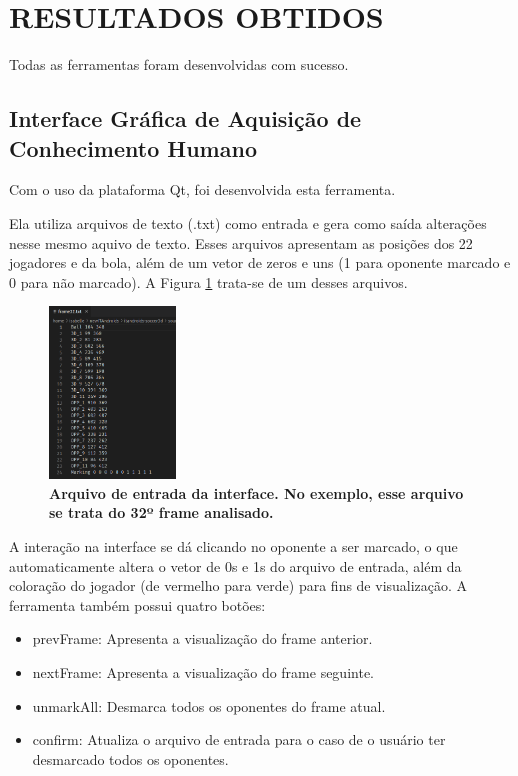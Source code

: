 \documentclass[10pt,fleqn,a4paper]{article}
\begin{document}
    \section{RESULTADOS OBTIDOS}
    
    Todas as ferramentas foram desenvolvidas com sucesso.
    
    \subsection{Interface Gráfica de Aquisição de Conhecimento Humano}
    
    Com o uso da plataforma Qt, foi desenvolvida esta ferramenta.
    
    Ela utiliza arquivos de texto (.txt) como entrada e gera como saída alterações nesse mesmo aquivo de texto. Esses arquivos apresentam as posições dos 22 jogadores e da bola, além de um vetor de zeros e uns (1 para oponente marcado e 0 para não marcado). A Figura \ref{fig:arquivo-de-entrada} trata-se de um desses arquivos.
    
\begin{figure}[H]
\centering
\includegraphics[width=0.3\textwidth]{figures/arquivo-de-entrada.png}
\caption{\textbf{Arquivo de entrada da interface. No exemplo, esse arquivo se trata do 32º frame analisado.}} \label{fig:arquivo-de-entrada}
\end{figure}
    
    A interação na interface se dá clicando no oponente a ser marcado, o que automaticamente altera o vetor de 0s e 1s do arquivo de entrada, além da coloração do jogador (de vermelho para verde) para fins de visualização. A ferramenta também possui quatro botões:
    
\begin{itemize}
\item prevFrame: Apresenta a visualização do frame anterior.
\item nextFrame: Apresenta a visualização do frame seguinte.
\item unmarkAll: Desmarca todos os oponentes do frame atual.
\item confirm: Atualiza o arquivo de entrada para o caso de o usuário ter desmarcado todos os oponentes.
\end{itemize}
\end{document}
